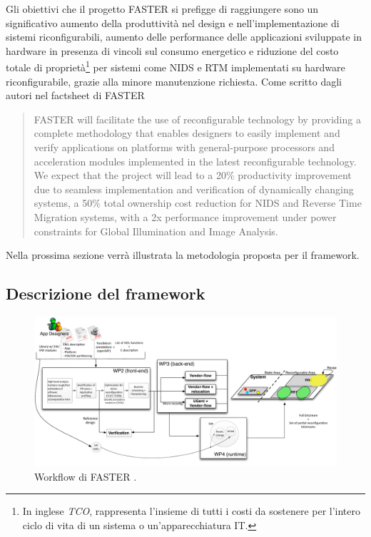Gli obiettivi che il progetto \ac{FASTER} si prefigge di raggiungere sono un 
significativo aumento della produttività nel design e nell'implementazione di 
sistemi riconfigurabili, aumento delle performance delle applicazioni 
sviluppate in hardware in presenza di vincoli sul consumo energetico e 
riduzione del costo totale di proprietà\footnote{In inglese \emph{\ac{TCO}}, 
rappresenta l'insieme di tutti i costi da sostenere per l'intero ciclo di 
vita di un sistema o un'apparecchiatura IT.} per sistemi come \ac{NIDS} e 
\ac{RTM} \cite{RTMArticle} implementati su hardware riconfigurabile, grazie alla minore 
manutenzione richiesta. Come scritto dagli autori nel factsheet di \ac{FASTER}
\cite{FasterFactsheet}


\begin{quotation}
  \ac{FASTER} will facilitate the use of reconfigurable technology by providing a complete
  methodology that enables designers to easily implement and verify applications on
  platforms with general-purpose processors and acceleration modules implemented in the
  latest reconfigurable technology.
  We expect that the 
  project will lead to a 20\% productivity improvement due to seamless 
  implementation and verification of dynamically changing systems, a 50\% total 
  ownership cost reduction for NIDS and Reverse Time Migration systems, with a 2x 
  performance improvement under power constraints for Global Illumination and 
  Image Analysis.
\end{quotation}


Nella prossima sezione verr\`a illustrata la metodologia proposta per il framework. 


\subsection{Descrizione del framework}
\label{sec:fasterMetodologia}


\begin{figure}
 \begin{center}  
\includegraphics[width=\textwidth]
{capitoli/figure/cap2/FASTERWorkflow.pdf}
\caption[Workflow di \acs{FASTER}]{Workflow di \acs{FASTER} \cite{FasterApproach}.}
\label{fig:FASTERWorkflow}
 \end{center}
\end{figure}

